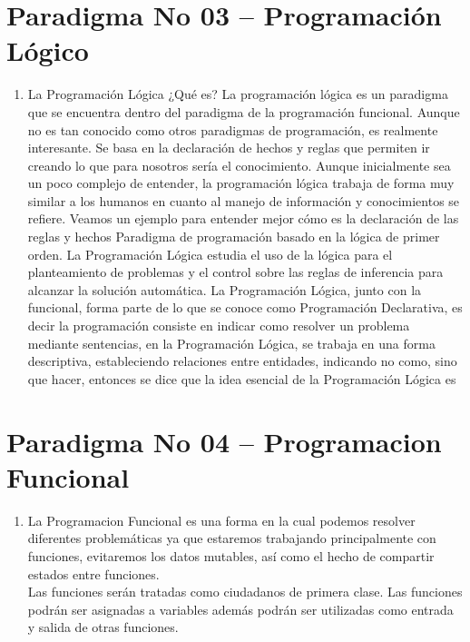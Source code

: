 \section{Paradigma No 03 – Programación Lógico} 

\begin{enumerate}[1.]
	\item La Programación Lógica  
¿Qué es?
La programación lógica es un paradigma que se encuentra dentro del paradigma de la programación funcional. Aunque no es tan conocido como otros paradigmas de programación, es realmente interesante. Se basa en la declaración de hechos y reglas que permiten ir creando lo que para nosotros sería el conocimiento. Aunque inicialmente sea un poco complejo de entender, la programación lógica trabaja de forma muy similar a los humanos en cuanto al manejo de información y conocimientos se refiere. Veamos un ejemplo para entender mejor cómo es la declaración de las reglas y hechos
Paradigma de programación basado en la lógica de primer orden. La Programación Lógica estudia el uso de la lógica para el planteamiento de problemas y el control sobre las reglas de inferencia para alcanzar la solución automática.
La Programación Lógica, junto con la funcional, forma parte de lo que se conoce como Programación Declarativa, es decir la programación consiste en indicar como resolver un problema mediante sentencias, en la Programación Lógica, se trabaja en una forma descriptiva, estableciendo relaciones entre entidades, indicando no como, sino que hacer, entonces se dice que la idea esencial de la Programación Lógica es

	

\end{enumerate}

\section{Paradigma No 04 – Programacion Funcional} 

\begin{enumerate}[1.]
	\item La Programacion Funcional  es una forma en la cual podemos resolver diferentes problemáticas ya que estaremos trabajando principalmente con funciones, evitaremos los datos mutables, así como el hecho de compartir estados entre funciones.
	\\Las funciones serán tratadas como ciudadanos de primera clase. Las funciones podrán ser asignadas a variables además podrán ser utilizadas como entrada y salida de otras funciones.
	

\end{enumerate}
